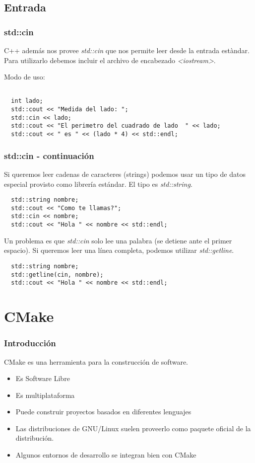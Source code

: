 \documentclass{beamer}
\begin{document}
\subsection{Entrada}
\begin{frame}[fragile]
\frametitle{std::cin}
C++ además nos provee \emph{std::cin} que nos permite leer desde la entrada estàndar.
Para utilizarlo debemos incluir el archivo de encabezado \emph{<iostream>}.

Modo de uso:
\begin{verbatim}
  
  int lado;
  std::cout << "Medida del lado: ";
  std::cin << lado;
  std::cout << "El perimetro del cuadrado de lado  " << lado;
  std::cout << " es " << (lado * 4) << std::endl;

\end{verbatim}

\end{frame}

\begin{frame}[fragile]
\frametitle{std::cin - continuación}
Si queremos leer cadenas de caracteres (strings) podemos usar un tipo de datos especial provisto como librería estándar.
El tipo es \emph{std::string}.

\begin{verbatim}
  std::string nombre;
  std::cout << "Como te llamas?";
  std::cin << nombre;
  std::cout << "Hola " << nombre << std::endl;
\end{verbatim}

Un problema es que \emph{std::cin} solo lee una palabra (se detiene ante el primer espacio). 
Si queremos leer una línea completa, podemos utilizar \emph{std::getline}.

\begin{verbatim}
  std::string nombre;
  std::getline(cin, nombre);
  std::cout << "Hola " << nombre << std::endl;
\end{verbatim}

\end{frame}

\section{CMake}

\begin{frame}
\frametitle{Introducción}
CMake es una herramienta para la construcción de software.
\begin{itemize}
 \item Es Software Libre
 \item Es multiplataforma
 \item Puede construir proyectos basados en diferentes lenguajes
 \item Las distribuciones de GNU/Linux suelen proveerlo como paquete oficial de la distribución.
 \item Algunos entornos de desarrollo se integran bien con CMake
\end{itemize}

\end{frame}
\end{document}
